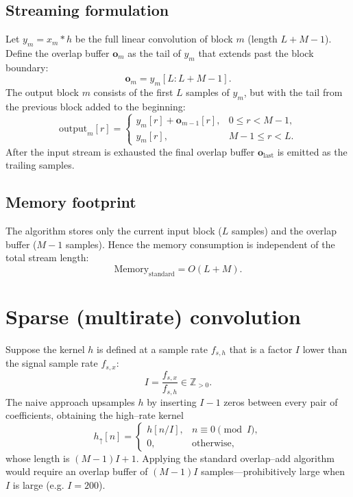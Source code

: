 \documentclass[a4paper,11pt]{article}
\begin{document}
\subsection{Streaming formulation}

Let $y_m = x_m * h$ be the full linear convolution of block $m$ (length $L+M-1$).  Define the overlap buffer $\mathbf{o}_m$ as the tail of $y_m$ that extends past the block boundary:
\begin{equation}
    \mathbf{o}_m = y_m[L : L+M-1] .
\end{equation}
The output block $m$ consists of the first $L$ samples of $y_m$, but with the tail from the previous block added to the beginning:
\begin{equation}
    \boxed{
        \text{output}_m[r] =
        \begin{cases}
            y_m[r] + \mathbf{o}_{m-1}[r], & 0 \le r < M-1, \\[4pt]
            y_m[r], & M-1 \le r < L .
        \end{cases}
    }
\end{equation}
After the input stream is exhausted the final overlap buffer $\mathbf{o}_{\text{last}}$ is emitted as the trailing samples.

\subsection{Memory footprint}

The algorithm stores only the current input block ($L$ samples) and the overlap buffer ($M-1$ samples).  Hence the memory consumption is independent of the total stream length:
\begin{equation}
    \text{Memory}_{\text{standard}} = O(L + M) .
\end{equation}

\section{Sparse (multirate) convolution}

Suppose the kernel $h$ is defined at a sample rate $f_{s,h}$ that is a factor $I$ lower than the signal sample rate $f_{s,x}$:
\begin{equation}
    I = \frac{f_{s,x}}{f_{s,h}} \in \mathbb{Z}_{>0} .
\end{equation}
The naive approach upsamples $h$ by inserting $I-1$ zeros between every pair of coefficients, obtaining the high--rate kernel
\begin{equation}
    h_{\uparrow}[n] =
    \begin{cases}
        h[n/I], & n \equiv 0 \pmod I, \\
        0, & \text{otherwise},
    \end{cases}
\end{equation}
whose length is $(M-1)I + 1$.  Applying the standard overlap--add algorithm would require an overlap buffer of $(M-1)I$ samples---prohibitively large when $I$ is large (e.g. $I = 200$).
\end{document}
